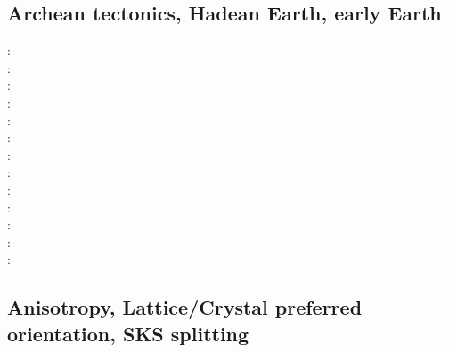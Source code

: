 \subsection{Archean tectonics, Hadean Earth, early Earth}

\begin{scriptsize}
\nineteeneightyfour: \cite{boas84}\\
\nineteenninetyfour: \cite{vlvv94}\\
\nineteenninetysix: \cite{kafo96}\\
\twothousand: \cite{devv00b}\\
\twothousandfour: \cite{vavv04b}\cite{vavv04}\\
\twothousandsix: \cite{reho06}\\
\twothousandeight: \cite{vava08}\\
\twothousandten: \cite{grpy10}\\
\twothousandfifteen: \cite{maha15}\\
\twothousandsixteen: \cite{onlw16}\cite{fige16}\\
\twothousandseventeen: \cite{onmz17}\\
\twothousandnineteen: \cite{canc19}\cite{gery19}\\
\twothousandtwenty: \cite{chcg20}
\end{scriptsize}

\subsection{Anisotropy, Lattice/Crystal preferred orientation, SKS splitting}
\label{sec:topics:anisotropy}

